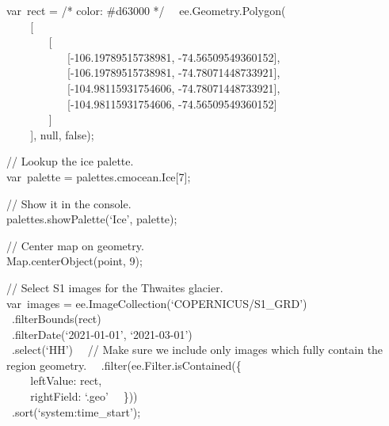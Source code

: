 \documentclass[
  letterpaper,
  DIV=11,
  numbers=noendperiod]{scrreprt}
\begin{document}
var~rect = /* color: \#d63000 */~ ~ee.Geometry.Polygon(\\
\hspace*{0.333em} ~ ~ ~{[}\\
\hspace*{0.333em} ~ ~ ~ ~ ~{[}\\
\hspace*{0.333em} ~ ~ ~ ~ ~ ~ ~{[}-106.19789515738981,
-74.56509549360152{]},\\
\hspace*{0.333em} ~ ~ ~ ~ ~ ~ ~{[}-106.19789515738981,
-74.78071448733921{]},\\
\hspace*{0.333em} ~ ~ ~ ~ ~ ~ ~{[}-104.98115931754606,
-74.78071448733921{]},\\
\hspace*{0.333em} ~ ~ ~ ~ ~ ~ ~{[}-104.98115931754606,
-74.56509549360152{]}\\
\hspace*{0.333em} ~ ~ ~ ~ ~{]}\\
\hspace*{0.333em} ~ ~ ~{]}, null, false);

// Lookup the ice palette.\\
var~palette = palettes.cmocean.Ice{[}7{]};

// Show it in the console.\\
palettes.showPalette(`Ice', palette);

// Center map on geometry.\\
Map.centerObject(point, 9);

// Select S1 images for the Thwaites glacier.\\
var~images = ee.ImageCollection(`COPERNICUS/S1\_GRD')\\
\hspace*{0.333em} ~.filterBounds(rect)\\
\hspace*{0.333em} ~.filterDate(`2021-01-01', `2021-03-01')\\
\hspace*{0.333em} ~.select(`HH')~ ~// Make sure we include only images
which fully contain the region geometry.~
~.filter(ee.Filter.isContained(\{\\
\hspace*{0.333em} ~ ~ ~leftValue: rect,\\
\hspace*{0.333em} ~ ~ ~rightField: `.geo'~ ~\}))\\
\hspace*{0.333em} ~.sort(`system:time\_start');
\end{document}
